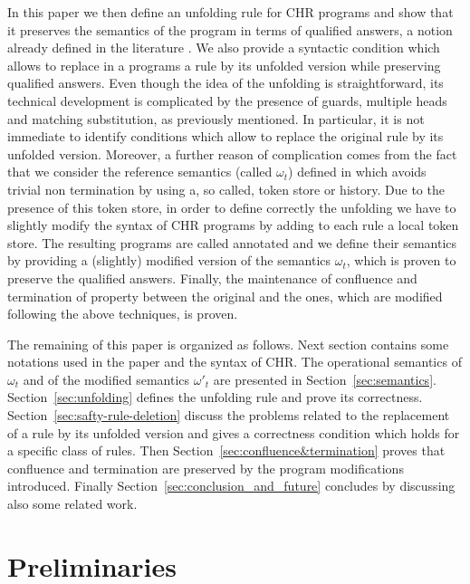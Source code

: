 \documentclass[final]{acmtrans2e}
\begin{document}
In this paper we then define an unfolding rule for CHR programs
and show that it preserves the semantics of the program in terms
of qualified answers, a notion already defined in the literature
\cite{Fru98}.
We also provide a syntactic condition which allows to replace in a
programs a rule by its unfolded version  while preserving
qualified answers. Even though the idea of the unfolding is
straightforward, its technical development is complicated by the
presence of guards, multiple heads and matching substitution,
as previously mentioned. In
particular, it is not immediate to identify conditions which
allow to replace the original rule by its unfolded version.
Moreover, a further reason of complication comes from the fact
that we consider the reference semantics (called $\omega_t$)
defined in \cite{DSGH04} which avoids trivial non termination by
using a, so called, token store or history. Due
to the presence of this token store,  in order to define correctly
the unfolding we have to slightly modify the syntax of CHR programs
by adding to each rule  a local token store. The resulting programs
are called annotated and we define their semantics by providing a
(slightly) modified version of the semantics $\omega_t$, which is
proven to preserve the qualified answers. Finally, the maintenance
of confluence and termination of property between the original and
the ones, which are modified following the above techniques, is proven.

The remaining of this paper is organized as follows. Next section
contains some notations used in the paper and the syntax of CHR.
The operational semantics of $\omega_t$ \cite{DSGH04} and of the
modified semantics $\omega'_t$  are presented  in
Section~\ref{sec:semantics}. Section~\ref{sec:unfolding} defines
the unfolding rule and prove its correctness.
Section~\ref{sec:safty-rule-deletion}  discuss the problems
related to the replacement of a rule by its unfolded version and
gives a correctness condition which holds for a specific class of
rules. Then Section~\ref{sec:confluence&termination} proves that
confluence and termination are preserved by the program modifications
introduced. Finally Section~\ref{sec:conclusion_and_future} concludes
by discussing also some related work.




\section{Preliminaries}\label{sec:notation}
\end{document}
